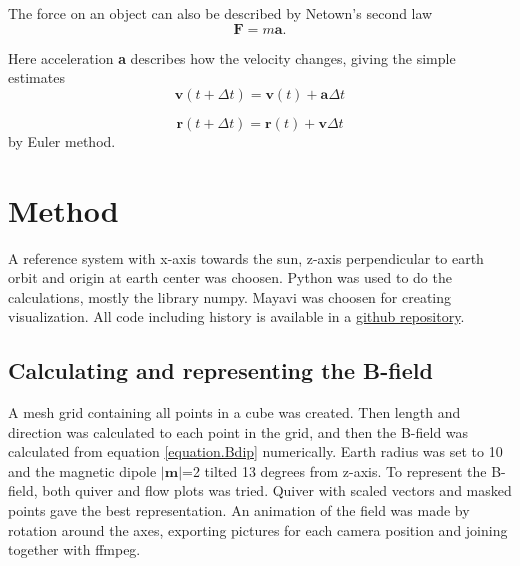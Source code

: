\documentclass[11pt,a4paper]{article}
\begin{document}
The force on an object can also be described by Netown's second law
\begin{equation}
\label{equation.force}
\textbf{F} = m\textbf{a}.
\end{equation}

Here acceleration \textbf{a} describes how the velocity changes, giving the simple estimates
\begin{equation}
\label{equation.velocity}
\textbf{v}(t+\Delta t) = \textbf{v}(t) + \textbf{a}\Delta t
\end{equation}

\begin{equation}
\label{equation.position}
\textbf{r}(t+\Delta t) = \textbf{r}(t) + \textbf{v}\Delta t
\end{equation}
by Euler method.



\section{Method}
A reference system with x-axis towards the sun, z-axis perpendicular to earth orbit and origin at earth center was choosen. Python was used to do the calculations, mostly the library numpy. Mayavi was choosen for creating visualization. All code including history is available in a \href{https://github.com/arve0/TFY4240-Semester-project}{github repository}.
\subsection{Calculating and representing the B-field}
A mesh grid containing all points in a cube was created. Then length and direction was calculated to each point in the grid, and then the B-field was calculated from equation \ref{equation.Bdip} numerically. Earth radius was set to 10 and the magnetic dipole $|\textbf{m}|$=2 tilted 13 degrees from z-axis.
To represent the B-field, both quiver and flow plots was tried. Quiver with scaled vectors and masked points gave the best representation. An animation of the field was made by rotation around the axes, exporting pictures for each camera position and joining together with ffmpeg.
\end{document}
